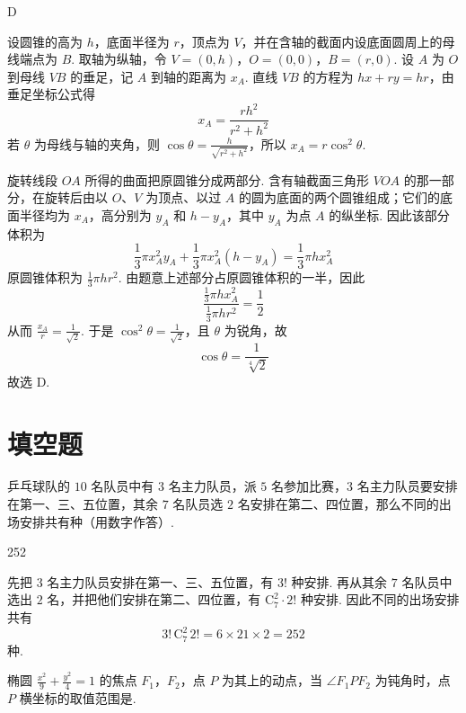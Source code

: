\begin{answer}
D
\end{answer}

\begin{solution}
设圆锥的高为 \(h\)，底面半径为 \(r\)，顶点为 \(V\)，并在含轴的截面内设底面圆周上的母线端点为 \(B\). 取轴为纵轴，令 \(V=(0,h)\)，\(O=(0,0)\)，\(B=(r,0)\). 设 \(A\) 为 \(O\) 到母线 \(VB\) 的垂足，记 \(A\) 到轴的距离为 \(x_A\). 直线 \(VB\) 的方程为 \(hx+ry=hr\)，由垂足坐标公式得
\[
x_A=\frac{rh^2}{r^2+h^2}
\]
若 \(\theta\) 为母线与轴的夹角，则 \(\cos\theta=\frac{h}{\sqrt{r^2+h^2}}\)，所以 \(x_A=r\cos^2\theta\).

旋转线段 \(OA\) 所得的曲面把原圆锥分成两部分. 含有轴截面三角形 \(VOA\) 的那一部分，在旋转后由以 \(O\)、\(V\) 为顶点、以过 \(A\) 的圆为底面的两个圆锥组成；它们的底面半径均为 \(x_A\)，高分别为 \(y_A\) 和 \(h-y_A\)，其中 \(y_A\) 为点 \(A\) 的纵坐标. 因此该部分体积为
\[
\frac13\pi x_A^2y_A+\frac13\pi x_A^2(h-y_A)=\frac13\pi h x_A^2
\]
原圆锥体积为 \(\frac13\pi h r^2\). 由题意上述部分占原圆锥体积的一半，因此
\[
\frac{\frac13\pi h x_A^2}{\frac13\pi h r^2}=\frac12
\]
从而 \(\frac{x_A}{r}=\frac1{\sqrt2}\). 于是 \(\cos^2\theta=\frac1{\sqrt2}\)，且 \(\theta\) 为锐角，故
\[
\cos\theta=\frac1{\sqrt[4]{2}}
\]
故选 D.
\end{solution}

\section{填空题}

\begin{problem}
乒乓球队的 \(10\) 名队员中有 \(3\) 名主力队员，派 \(5\) 名参加比赛，\(3\) 名主力队员要安排在第一、三、五位置，其余 \(7\) 名队员选 \(2\) 名安排在第二、四位置，那么不同的出场安排共有\fillinblank{}种（用数字作答）.
\end{problem}

\begin{answer}
252
\end{answer}

\begin{solution}
先把 \(3\) 名主力队员安排在第一、三、五位置，有 \(3!\) 种安排. 再从其余 \(7\) 名队员中选出 \(2\) 名，并把他们安排在第二、四位置，有 \(\mathrm C_7^2\cdot2!\) 种安排. 因此不同的出场安排共有
\[
3!\,\mathrm C_7^2\,2!=6\times21\times2=252
\]
种.
\end{solution}

\begin{problem}
椭圆 \(\frac{x^2}{9}+\frac{y^2}{4}=1\) 的焦点 \(F_1\)，\(F_2\)，点 \(P\) 为其上的动点，当 \(\angle F_1PF_2\) 为钝角时，点 \(P\) 横坐标的取值范围是\fillinblank{}.
\end{problem}

